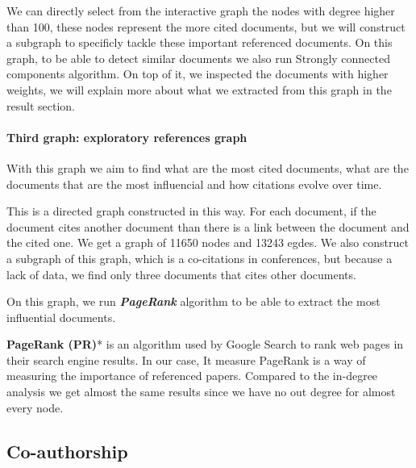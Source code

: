 \documentclass[journal,twocolumn]{IEEEtran}
\begin{document}
    \begin{figure}
        \begin{center}\end{center}
        \caption{}
        \label{}
    \end{figure}
    
    We can directly select from the interactive graph the nodes with degree
higher than 100, these nodes represent the more cited documents, but we
will construct a subgraph to specificly tackle these important
referenced documents. On this graph, to be able to detect similar
documents we also run Strongly connected components algorithm. On top of
it, we inspected the documents with higher weights, we will explain more
about what we extracted from this graph in the result section.

    \hypertarget{third-graph-exploratory-references-graph}{%
\paragraph{Third graph: exploratory references
graph}\label{third-graph-exploratory-references-graph}}

With this graph we aim to find what are the most cited documents, what
are the documents that are the most influencial and how citations evolve
over time.

This is a directed graph constructed in this way. For each document, if
the document cites another document than there is a link between the
document and the cited one. We get a graph of 11650 nodes and 13243
egdes. We also construct a subgraph of this graph, which is a
co-citations in conferences, but because a lack of data, we find only
three documents that cites other documents.

On this graph, we run \textbf{\emph{PageRank}} algorithm to be able to
extract the most influential documents.

\textbf{PageRank (PR)}* is an algorithm used by Google Search to rank
web pages in their search engine results. In our case, It measure
PageRank is a way of measuring the importance of referenced papers.
Compared to the in-degree analysis we get almost the same results since
we have no out degree for almost every node.



    \hypertarget{co-authorship}{%
\subsection{Co-authorship}\label{co-authorship}}
\end{document}
